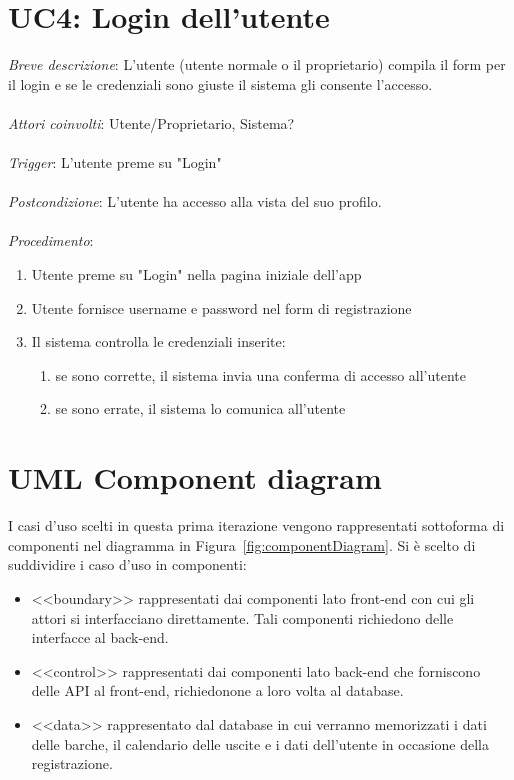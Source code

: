 \section{UC4: Login dell'utente}
\emph{Breve descrizione}: L'utente (utente normale o il proprietario) compila il form per il login e se le credenziali sono giuste il sistema gli consente l'accesso.\\\\
\emph{Attori coinvolti}: Utente/Proprietario, Sistema?\\\\
\emph{Trigger}: L'utente preme su "Login"\\\\
\emph{Postcondizione}: L'utente ha accesso alla vista del suo profilo.\\\\
\emph{Procedimento}:
\begin{enumerate}
	\item Utente preme su "Login" nella pagina iniziale dell'app
	\item Utente fornisce username e password nel form di registrazione
	\item Il sistema controlla le credenziali inserite:
		\begin{enumerate}
		     \item se sono corrette, il sistema invia una conferma di accesso all'utente
		     \item se sono errate, il sistema lo comunica all'utente
		\end{enumerate}
\end{enumerate}

\section{UML Component diagram}
I casi d'uso scelti in questa prima iterazione vengono rappresentati sottoforma di componenti nel diagramma in Figura~\ref{fig:componentDiagram}.
Si è scelto di suddividire i caso d'uso in componenti:

\begin{itemize}
    \item <<boundary>> rappresentati dai componenti lato front-end con cui gli attori si interfacciano direttamente. Tali componenti richiedono delle interfacce al back-end.
    \item <<control>> rappresentati dai componenti lato back-end che forniscono delle API al front-end, richiedonone a loro volta al database.
    \item <<data>> rappresentato dal database in cui verranno memorizzati i dati delle barche, il calendario delle uscite e i dati dell'utente in occasione della registrazione.
\end{itemize}

